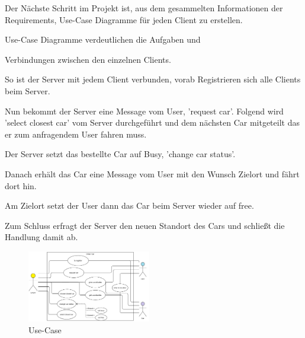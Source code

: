 Der Nächste Schritt im Projekt ist, aus dem gesammelten Informationen der Requirements, Use-Case Diagramme für jeden Client zu erstellen.


Use-Case Diagramme verdeutlichen die 
Aufgaben und 

Verbindungen zwischen den einzelnen Clients.


So ist der Server mit jedem Client verbunden, vorab Registrieren sich alle Clients beim Server. 


Nun bekommt der Server eine Message vom User, 'request car'.
Folgend wird 'select closest car' vom Server durchgeführt und dem nächsten Car mitgeteilt das er zum anfragendem User fahren muss. 


Der Server setzt das bestellte Car auf Busy, 'change car status'.


Danach erhält das Car eine Message vom User mit den Wunsch Zielort und fährt dort hin.


Am Zielort setzt der User dann das Car beim Server wieder auf free.


Zum Schluss erfragt der Server den neuen Standort des Cars und schließt die Handlung damit ab.



\begin{figure}[htbp] 
  \centering
     \includegraphics[width=0.48\textwidth]{Use-Case_Server.png}
     \caption{Use-Case}
\end{figure}


